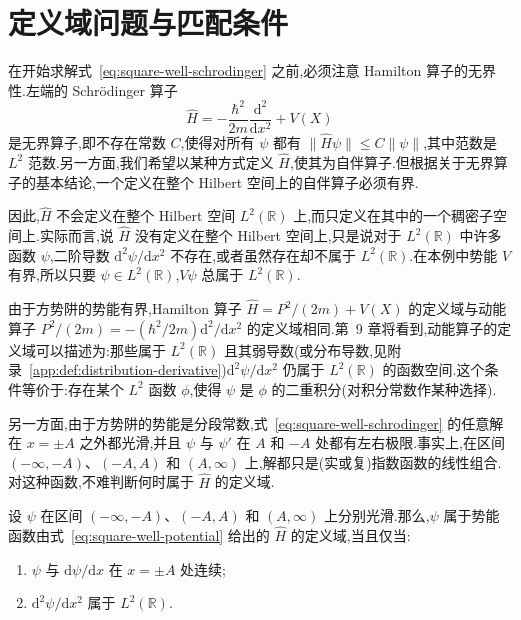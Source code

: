 \section{定义域问题与匹配条件}\label{sec:square-well-domain}

在开始求解式~\eqref{eq:square-well-schrodinger} 之前,必须注意 Hamilton 算子的无界性.左端的 Schrödinger 算子
\[
\widehat H=-\frac{\hbar^{2}}{2m}\frac{\mathrm{d}^{2}}{\mathrm{d}x^{2}}+V(X)
\]
是无界算子,即不存在常数 \(C\),使得对所有 \(\psi\) 都有 \(\|\widehat H\psi\|\le C\|\psi\|\),其中范数是 \(L^{2}\) 范数.另一方面,我们希望以某种方式定义 \(\widehat H\),使其为自伴算子.但根据关于无界算子的基本结论,一个定义在整个 Hilbert 空间上的自伴算子必须有界.

因此,\(\widehat H\) 不会定义在整个 Hilbert 空间 \(L^{2}(\mathbb{R})\) 上,而只定义在其中的一个稠密子空间上.实际而言,说 \(\widehat H\) 没有定义在整个 Hilbert 空间上,只是说对于 \(L^{2}(\mathbb{R})\) 中许多函数 \(\psi\),二阶导数 \(\mathrm{d}^{2}\psi/\mathrm{d}x^{2}\) 不存在,或者虽然存在却不属于 \(L^{2}(\mathbb{R})\).在本例中势能 \(V\) 有界,所以只要 \(\psi\in L^{2}(\mathbb{R})\),\(V\psi\) 总属于 \(L^{2}(\mathbb{R})\).

由于方势阱的势能有界,Hamilton 算子 \(\widehat H=P^{2}/(2m)+V(X)\) 的定义域与动能算子 \(P^{2}/(2m)=-(\hbar^{2}/2m)\mathrm{d}^{2}/\mathrm{d}x^{2}\) 的定义域相同.第~9 章将看到,动能算子的定义域可以描述为:那些属于 \(L^{2}(\mathbb{R})\) 且其弱导数(或分布导数,见附录~\ref{app:def:distribution-derivative})\(\mathrm{d}^{2}\psi/\mathrm{d}x^{2}\) 仍属于 \(L^{2}(\mathbb{R})\) 的函数空间.这个条件等价于:存在某个 \(L^{2}\) 函数 \(\phi\),使得 \(\psi\) 是 \(\phi\) 的二重积分(对积分常数作某种选择).

另一方面,由于方势阱的势能是分段常数,式~\eqref{eq:square-well-schrodinger} 的任意解在 \(x=\pm A\) 之外都光滑,并且 \(\psi\) 与 \(\psi'\) 在 \(A\) 和 \(-A\) 处都有左右极限.事实上,在区间 \((-\infty,-A)\)、\((-A,A)\) 和 \((A,\infty)\) 上,解都只是(实或复)指数函数的线性组合.对这种函数,不难判断何时属于 \(\widehat H\) 的定义域.

\begin{proposition}[方势阱的定义域条件]\label{prop:square-well-domain}
设 \(\psi\) 在区间 \((-\infty,-A)\)、\((-A,A)\) 和 \((A,\infty)\) 上分别光滑.那么,\(\psi\) 属于势能函数由式~\eqref{eq:square-well-potential} 给出的 \(\widehat H\) 的定义域,当且仅当:
\begin{enumerate}
\item \(\psi\) 与 \(\mathrm{d}\psi/\mathrm{d}x\) 在 \(x=\pm A\) 处连续;
\item \(\mathrm{d}^{2}\psi/\mathrm{d}x^{2}\) 属于 \(L^{2}(\mathbb{R})\).
\end{enumerate}
\end{proposition}

